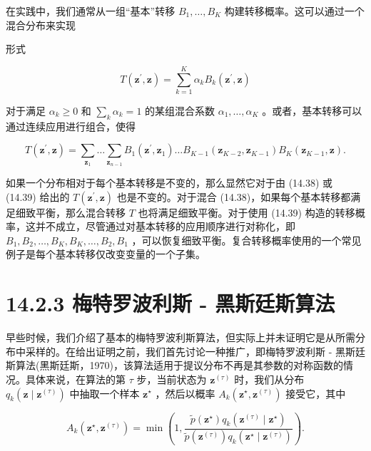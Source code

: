 \documentclass[10pt]{article}
\begin{document}
在实践中，我们通常从一组“基本”转移 \({B}_{1},\ldots ,{B}_{K}\) 构建转移概率。这可以通过一个混合分布来实现

形式

\[
T\left( {{\mathbf{z}}^{\prime },\mathbf{z}}\right)  = \mathop{\sum }\limits_{{k = 1}}^{K}{\alpha }_{k}{B}_{k}\left( {{\mathbf{z}}^{\prime },\mathbf{z}}\right)  \tag{14.38}
\]

对于满足 \({\alpha }_{k} \geq  0\) 和 \(\mathop{\sum }\limits_{k}{\alpha }_{k} = 1\) 的某组混合系数 \({\alpha }_{1},\ldots ,{\alpha }_{K}\) 。或者，基本转移可以通过连续应用进行组合，使得

\[
T\left( {{\mathbf{z}}^{\prime },\mathbf{z}}\right)  = \mathop{\sum }\limits_{{\mathbf{z}}_{1}}\ldots \mathop{\sum }\limits_{{\mathbf{z}}_{n - 1}}{B}_{1}\left( {{\mathbf{z}}^{\prime },{\mathbf{z}}_{1}}\right) \ldots {B}_{K - 1}\left( {{\mathbf{z}}_{K - 2},{\mathbf{z}}_{K - 1}}\right) {B}_{K}\left( {{\mathbf{z}}_{K - 1},\mathbf{z}}\right) . \tag{14.39}
\]

如果一个分布相对于每个基本转移是不变的，那么显然它对于由 (14.38) 或 (14.39) 给出的 \(T\left( {{\mathbf{z}}^{\prime },\mathbf{z}}\right)\) 也是不变的。对于混合 (14.38)，如果每个基本转移都满足细致平衡，那么混合转移 \(T\) 也将满足细致平衡。对于使用 (14.39) 构造的转移概率，这并不成立，尽管通过对基本转移的应用顺序进行对称化，即 \({B}_{1},{B}_{2},\ldots ,{B}_{K},{B}_{K},\ldots ,{B}_{2},{B}_{1}\) ，可以恢复细致平衡。复合转移概率使用的一个常见例子是每个基本转移仅改变变量的一个子集。

\section*{14.2.3 梅特罗波利斯 - 黑斯廷斯算法}

早些时候，我们介绍了基本的梅特罗波利斯算法，但实际上并未证明它是从所需分布中采样的。在给出证明之前，我们首先讨论一种推广，即梅特罗波利斯 - 黑斯廷斯算法(黑斯廷斯，1970)，该算法适用于提议分布不再是其参数的对称函数的情况。具体来说，在算法的第 \(\tau\) 步，当前状态为 \({\mathbf{z}}^{\left( \tau \right) }\) 时，我们从分布 \({q}_{k}\left( {\mathbf{z} \mid  {\mathbf{z}}^{\left( \tau \right) }}\right)\) 中抽取一个样本 \({\mathbf{z}}^{ \star  }\) ，然后以概率 \({A}_{k}\left( {{\mathbf{z}}^{ \star  },{\mathbf{z}}^{\left( \tau \right) }}\right)\) 接受它，其中

\[
{A}_{k}\left( {{\mathbf{z}}^{ \star  },{\mathbf{z}}^{\left( \tau \right) }}\right)  = \min \left( {1,\frac{\widetilde{p}\left( {\mathbf{z}}^{ \star  }\right) {q}_{k}\left( {{\mathbf{z}}^{\left( \tau \right) } \mid  {\mathbf{z}}^{ \star  }}\right) }{\widetilde{p}\left( {\mathbf{z}}^{\left( \tau \right) }\right) {q}_{k}\left( {{\mathbf{z}}^{ \star  } \mid  {\mathbf{z}}^{\left( \tau \right) }}\right) }}\right) . \tag{14.40}
\]
\end{document}

